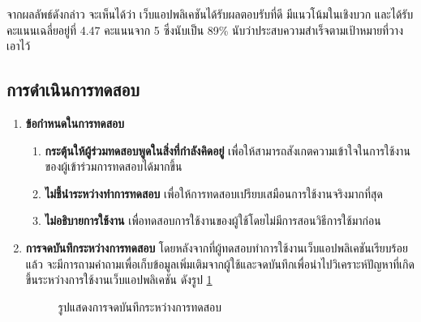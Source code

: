 \begin{enumerate}
          จากผลลัพธ์ดังกล่าว จะเห็นได้ว่า เว็บแอปพลิเคชันได้รับผลตอบรับที่ดี มีแนวโน้มในเชิงบวก และได้รับคะแนนเฉลี่ยอยู่ที่ 4.47 คะแนนจาก 5 ซึ่งนับเป็น 89\%
          นับว่าประสบความสำเร็จตามเป้าหมายที่วางเอาไว้

\end{enumerate}
\subsection{การดำเนินการทดสอบ}
\begin{enumerate}
    \item \textbf{ข้อกำหนดในการทดสอบ}
          \begin{enumerate}
              \item \textbf{กระตุ้นให้ผู้ร่วมทดสอบพูดในสิ่งที่กำลังคิดอยู่} เพื่อให้สามารถสังเกตความเข้าใจในการใช้งานของผู้เข้าร่วมการทดสอบได้มากขึ้น
              \item \textbf{ไม่ชี้นำระหว่างทำการทดสอบ} เพื่อให้การทดสอบเปรียบเสมือนการใช้งานจริงมากที่สุด
              \item \textbf{ไม่อธิบายการใช้งาน} เพื่อทดสอบการใช้งานของผู้ใช้โดยไม่มีการสอนวิธีการใช้มาก่อน
          \end{enumerate}
    \item \textbf{การจดบันทึกระหว่างการทดสอบ} โดยหลังจากที่ผู้ทดสอบทำการใช้งานเว็บแอปพลิเคชันเรียบร้อยแล้ว จะมีการถามคำถามเพื่อเก็บข้อมูลเพิ่มเติมจากผู้ใช้และจดบันทึกเพื่อนำไปวิเคราะห์ปัญหาที่เกิดขึ้นระหว่างการใช้งานเว็บแอปพลิเคชัน ดังรูป \ref{fig:NoteTaking}
          \begin{figure}[H]\centering
              \caption{รูปแสดงการจดบันทึกระหว่างการทดสอบ}\label{fig:NoteTaking}
          \end{figure}
\end{enumerate}
